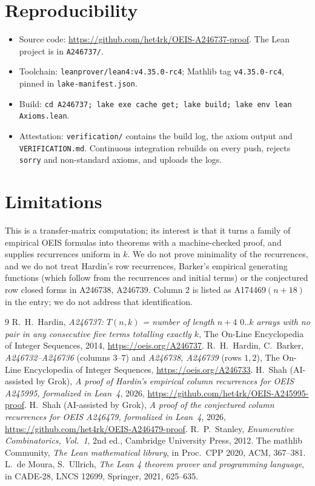 \documentclass[11pt]{article}
\theoremstyle{remark}\newtheorem{remark}[theorem]{Remark}
\begin{document}
\section{Reproducibility}
\begin{itemize}
\item Source code: \url{https://github.com/het4rk/OEIS-A246737-proof}. The Lean project is in \texttt{A246737/}.
\item Toolchain: \texttt{leanprover/lean4:v4.35.0-rc4}; Mathlib tag \texttt{v4.35.0-rc4}, pinned in \texttt{lake-manifest.json}.
\item Build: \texttt{cd A246737; lake exe cache get; lake build; lake env lean Axioms.lean}.
\item Attestation: \texttt{verification/} contains the build log, the axiom output and \texttt{VERIFICATION.md}. Continuous integration rebuilds on every push, rejects \texttt{sorry} and non-standard axioms, and uploads the logs.
\end{itemize}

\section{Limitations}
This is a transfer-matrix computation; its interest is that it turns a family of empirical OEIS formulas into theorems with a machine-checked proof, and supplies recurrences uniform in $k$. We do not prove minimality of the recurrences, and we do not treat Hardin's row recurrences, Barker's empirical generating functions (which follow from the recurrences and initial terms) or the conjectured row closed forms in A246738, A246739. Column 2 is listed as A174469$(n+18)$ in the entry; we do not address that identification.

\begin{thebibliography}{9}
 R.~H.~Hardin, \emph{A246737: $T(n,k)$ = number of length $n+4$ $0..k$ arrays with no pair in any consecutive five terms totalling exactly $k$}, The On-Line Encyclopedia of Integer Sequences, 2014, \url{https://oeis.org/A246737}.
 R.~H.~Hardin, C.~Barker, \emph{A246732--A246736} (columns $3$--$7$) and \emph{A246738, A246739} (rows $1,2$), The On-Line Encyclopedia of Integer Sequences, \url{https://oeis.org/A246733}.
 H.~Shah (AI-assisted by Grok), \emph{A proof of Hardin's empirical column recurrences for OEIS A245995, formalized in Lean~4}, 2026, \url{https://github.com/het4rk/OEIS-A245995-proof}.
 H.~Shah (AI-assisted by Grok), \emph{A proof of the conjectured column recurrences for OEIS A246479, formalized in Lean~4}, 2026, \url{https://github.com/het4rk/OEIS-A246479-proof}.
 R.~P.~Stanley, \emph{Enumerative Combinatorics, Vol.~1}, 2nd ed., Cambridge University Press, 2012.
 The mathlib Community, \emph{The Lean mathematical library}, in Proc.\ CPP 2020, ACM, 367--381.
 L.~de Moura, S.~Ullrich, \emph{The Lean 4 theorem prover and programming language}, in CADE-28, LNCS 12699, Springer, 2021, 625--635.
\end{thebibliography}
\end{document}
